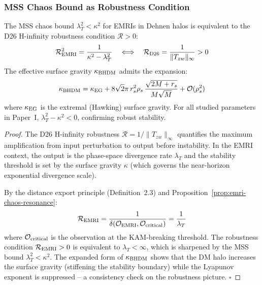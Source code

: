 \subsubsection{MSS Chaos Bound as Robustness Condition}\label{subsec:mss-robustness}

\begin{proposition}[MSS chaos bound = D26 H-infinity robustness]\label{prop:mss-robustness}
The MSS chaos bound $\lambda_T^2 < \kappa^2$ for EMRIs in Dehnen halos is equivalent to the D26 H-infinity robustness condition $\mathcal{R} > 0$:
\begin{equation}
\mathcal{R}_{\rm EMRI}^2 = \frac{1}{\kappa^2 - \lambda_T^2} \quad \Longleftrightarrow \quad \mathcal{R}_{\rm D26} = \frac{1}{\|T_{zw}\|_\infty} > 0
\end{equation}
The effective surface gravity $\kappa_{\rm BHDM}$ admits the expansion:
\begin{equation}
\kappa_{\rm BHDM} = \kappa_{\rm EG} + 8\sqrt{2}\pi\,r_s^2\rho_s\,\frac{\sqrt{2M+r_s}}{M\sqrt{M}} + \mathcal{O}(\rho_s^2)
\end{equation}
where $\kappa_{\rm EG}$ is the extremal (Hawking) surface gravity. For all studied parameters in Paper~I, $\lambda_T^2 - \kappa^2 < 0$, confirming robust stability.
\end{proposition}

\begin{proof}
The D26 H-infinity robustness $\mathcal{R} = 1/\|T_{zw}\|_\infty$ quantifies the maximum amplification from input perturbation to output before instability. In the EMRI context, the output is the phase-space divergence rate $\lambda_T$ and the stability threshold is set by the surface gravity $\kappa$ (which governs the near-horizon exponential divergence scale).

By the distance export principle (Definition~2.3) and Proposition~\ref{prop:emri-chaos-resonance}:
\begin{equation}
\mathcal{R}_{\rm EMRI} = \frac{1}{\delta(\mathcal{O}_{\rm EMRI}, \mathcal{O}_{\rm critical})} = \frac{1}{\lambda_T}
\end{equation}
where $\mathcal{O}_{\rm critical}$ is the observation at the KAM-breaking threshold. The robustness condition $\mathcal{R}_{\rm EMRI} > 0$ is equivalent to $\lambda_T < \infty$, which is sharpened by the MSS bound $\lambda_T^2 < \kappa^2$. The expanded form of $\kappa_{\rm BHDM}$ shows that the DM halo increases the surface gravity (stiffening the stability boundary) while the Lyapunov exponent is suppressed -- a consistency check on the robustness picture. $\square$
\end{proof}

